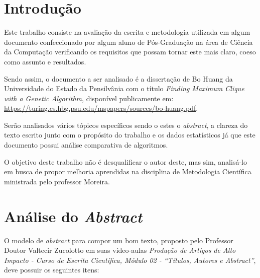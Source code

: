 \documentclass[portugues, brazil, a4paper,12pt]{article}
\begin{document}

\section{Introdução}
	Este trabalho consiste na avaliação da escrita e metodologia utilizada em algum documento confeccionado por algum aluno de Pós-Graduação na área de Ciência da Computação verificando os requisitos que possam tornar este mais claro, coeso como assunto e resultados.
	
	Sendo assim, o documento a ser analisado é a dissertação de Bo Huang da Universidade do Estado da Pensilvânia com o título \textit{Finding Maximum Clique with a Genetic Algorithm}, disponível publicamente em: \url{https://turing.cs.hbg.psu.edu/mspapers/sources/bo-huang.pdf}.
	
	Serão analisados vários tópicos específicos sendo o estes o \textit{abstract}, a clareza do texto escrito junto com o propósito do trabalho e os dados estatísticos já que este documento possui análise comparativa de algoritmos.
	
	O objetivo deste trabalho não é desqualificar o autor deste, mas sim, analisá-lo em busca de propor melhoria aprendidas na disciplina de Metodologia Científica ministrada pelo professor Moreira.
	
	
\section{Análise do \textit{Abstract}}
	O modelo de \textit{abstract} para compor um bom texto, proposto pelo Professor Doutor Valtecir Zucolotto em suas vídeo-aulas \textit{Produção de Artigos de Alto Impacto - Curso de Escrita Científica, Módulo 02 - ``Títulos, Autores e Abstract''}, deve possuir os seguintes itens:
	
\end{document}
